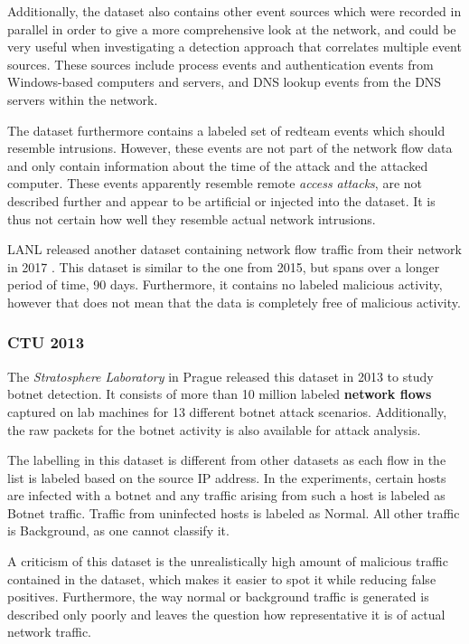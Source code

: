\documentclass[a4paper,12pt,twoside]{report}
\begin{document}
Additionally, the dataset also contains other event sources which were recorded in parallel in order to give a more comprehensive look at the network, and could be very useful when investigating a detection approach that correlates multiple event sources. These sources include process events and authentication events from Windows-based computers and servers, and DNS lookup events from the DNS servers within the network. 

The dataset furthermore contains a labeled set of redteam events which should resemble intrusions. However, these events are not part of the network flow data and only contain information about the time of the attack and the attacked computer. These events apparently resemble remote \textit{access attacks}, are not described further and appear to be artificial or injected into the dataset. It is thus not certain how well they resemble actual network intrusions.


LANL released another dataset containing network flow traffic from their network in 2017 \cite{turcotte17}. This dataset is similar to the one from 2015, but spans over a longer period of time, 90 days. Furthermore, it contains no labeled malicious activity,  however that does not mean that the data is completely free of malicious activity.

\subsubsection*{CTU 2013 \cite{noauthor_ctu-13_nodate, garcia2014empirical}}

The \textit{Stratosphere Laboratory} in Prague released this dataset in 2013 to study botnet detection. It consists of more than 10 million labeled \textbf{network flows} captured on lab machines for 13 different botnet attack scenarios. Additionally, the raw packets for the botnet activity is also available for attack analysis. 

The labelling in this dataset is different from other datasets as each  flow  in  the  list  is  labeled  based  on  the  source  IP  address.  In  the experiments,  certain  hosts  are  infected  with  a  botnet  and  any  traffic  arising from such a host is labeled as Botnet traffic. Traffic from uninfected hosts is labeled as Normal. All other traffic is Background, as one cannot classify it. 

A criticism of this dataset is the unrealistically high amount of malicious traffic contained in the dataset, which makes it easier to spot it while reducing false positives. Furthermore, the way normal or background traffic is generated is described only poorly and leaves the question how representative it is of actual network traffic.
\end{document}
